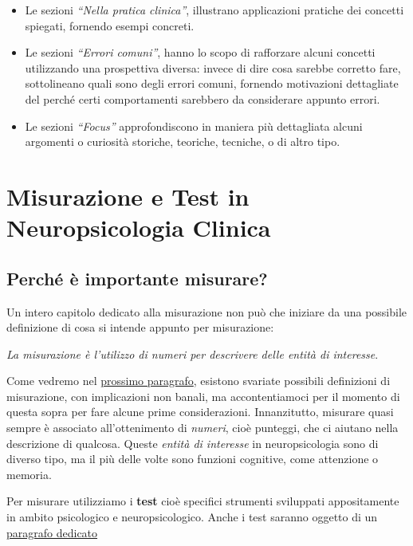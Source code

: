 \documentclass[
  italian,
  letterpaper,
  paper=A4,
  headinclude=on,
  footinclude=on,
  12pt]{scrbook}
\providecommand{\tightlist}{%
  \setlength{\itemsep}{0pt}\setlength{\parskip}{0pt}}
\begin{document}
\begin{itemize}
\tightlist
\item
  Le sezioni \emph{``Nella pratica clinica''}, illustrano applicazioni
  pratiche dei concetti spiegati, fornendo esempi concreti.
\item
  Le sezioni \emph{``Errori comuni''}, hanno lo scopo di rafforzare
  alcuni concetti utilizzando una prospettiva diversa: invece di dire
  cosa sarebbe corretto fare, sottolineano quali sono degli errori
  comuni, fornendo motivazioni dettagliate del perché certi
  comportamenti sarebbero da considerare appunto errori.
\item
  Le sezioni \emph{``Focus''} approfondiscono in maniera più dettagliata
  alcuni argomenti o curiosità storiche, teoriche, tecniche, o di altro
  tipo.
\end{itemize}


\chapter{Misurazione e Test in Neuropsicologia
Clinica}\label{misurazione-e-test-in-neuropsicologia-clinica}

\section{Perché è importante
misurare?}\label{perchuxe9-uxe8-importante-misurare}

Un intero capitolo dedicato alla misurazione non può che iniziare da una
possibile definizione di cosa si intende appunto per misurazione:

\emph{La misurazione è l'utilizzo di numeri per descrivere delle entità
di interesse}.

Come vedremo nel
\hyperref[misurazione_e_neuropsicologia_clinica]{prossimo paragrafo},
esistono svariate possibili definizioni di misurazione, con implicazioni
non banali, ma accontentiamoci per il momento di questa sopra per fare
alcune prime considerazioni. Innanzitutto, misurare quasi sempre è
associato all'ottenimento di \emph{numeri}, cioè punteggi, che ci
aiutano nella descrizione di qualcosa. Queste \emph{entità di interesse}
in neuropsicologia sono di diverso tipo, ma il più delle volte sono
funzioni cognitive, come attenzione o memoria.

Per misurare utilizziamo i \textbf{test} cioè specifici strumenti
sviluppati appositamente in ambito psicologico e neuropsicologico. Anche
i test saranno oggetto di un \hyperref[i-test]{paragrafo dedicato}
\end{document}
